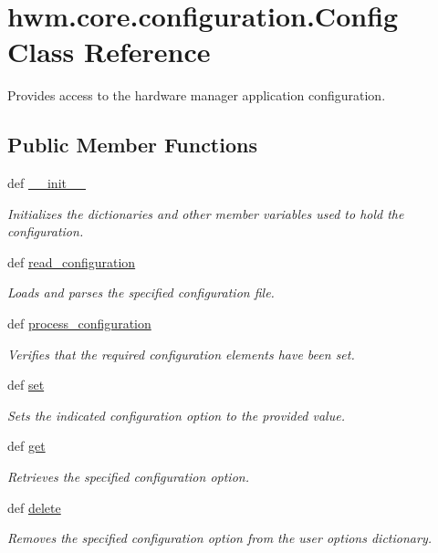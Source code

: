 \hypertarget{classhwm_1_1core_1_1configuration_1_1_config}{\section{hwm.\-core.\-configuration.\-Config Class Reference}
\label{classhwm_1_1core_1_1configuration_1_1_config}
}


Provides access to the hardware manager application configuration.  


\subsection*{Public Member Functions}
\begin{DoxyCompactItemize}
\item 
def \hyperlink{classhwm_1_1core_1_1configuration_1_1_config_a06460bf2af249c6601827b2afde8b291}{\-\_\-\-\_\-init\-\_\-\-\_\-}
\begin{DoxyCompactList}\small\item\em Initializes the dictionaries and other member variables used to hold the configuration. \end{DoxyCompactList}\item 
def \hyperlink{classhwm_1_1core_1_1configuration_1_1_config_a805d1df7708afb305e85079d729d8369}{read\-\_\-configuration}
\begin{DoxyCompactList}\small\item\em Loads and parses the specified configuration file. \end{DoxyCompactList}\item 
def \hyperlink{classhwm_1_1core_1_1configuration_1_1_config_ada75769149ea06f7142856fa0a73f5a3}{process\-\_\-configuration}
\begin{DoxyCompactList}\small\item\em Verifies that the required configuration elements have been set. \end{DoxyCompactList}\item 
def \hyperlink{classhwm_1_1core_1_1configuration_1_1_config_ac34da53e95cd38ebc84368e42cbcd95a}{set}
\begin{DoxyCompactList}\small\item\em Sets the indicated configuration option to the provided value. \end{DoxyCompactList}\item 
def \hyperlink{classhwm_1_1core_1_1configuration_1_1_config_a384f394128523c4395e4a6e9f3d5d906}{get}
\begin{DoxyCompactList}\small\item\em Retrieves the specified configuration option. \end{DoxyCompactList}\item 
def \hyperlink{classhwm_1_1core_1_1configuration_1_1_config_a59b1c4c8c34be86e011dd9102e07cfbd}{delete}
\begin{DoxyCompactList}\small\item\em Removes the specified configuration option from the user options dictionary. \end{DoxyCompactList}\end{DoxyCompactItemize}
